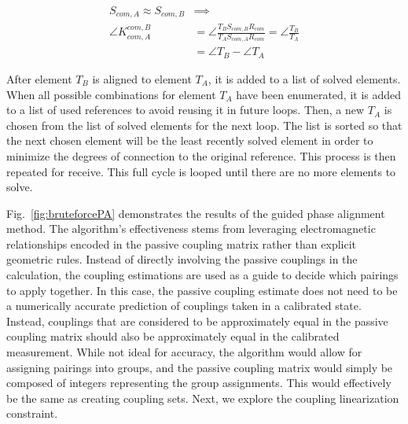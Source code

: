 \documentclass[journal]{IEEEtran}
\begin{document}
\begin{align}
    S_{com,A} \approx S_{com,B} &\implies \nonumber \\
    \angle K^{com,B}_{com,A} &= \angle \frac{T_{B} S_{com,B} R_{com}}{T_{A} S_{com,A} R_{com}} = \angle \frac{T_B}{T_A} \nonumber \\
    &= \angle T_B - \angle T_A
    \label{eq:phaseAlign}
\end{align}


After element $T_B$ is aligned to element $T_A$, it is added to a list of solved elements. When all possible combinations for element $T_A$ have been enumerated, it is added to a list of used references to avoid reusing it in future loops. Then, a new $T_A$ is chosen from the list of solved elements for the next loop. The list is sorted so that the next chosen element will be the least recently solved element in order to minimize the degrees of connection to the original reference. This process is then repeated for receive. This full cycle is looped until there are no more elements to solve.

Fig.~\ref{fig:bruteforcePA} demonstrates the results of the guided phase alignment method. The algorithm's effectiveness stems from leveraging electromagnetic relationships encoded in the passive coupling matrix rather than explicit geometric rules. Instead of directly involving the passive couplings in the calculation, the coupling estimations are used as a guide to decide which pairings to apply together. In this case, the passive coupling estimate does not need to be a numerically accurate prediction of couplings taken in a calibrated state. Instead, couplings that are considered to be approximately equal in the passive coupling matrix should also be approximately equal in the calibrated measurement. While not ideal for accuracy, the algorithm would allow for assigning pairings into groups, and the passive coupling matrix would simply be composed of integers representing the group assignments. This would effectively be the same as creating coupling sets. Next, we explore the coupling linearization constraint.
\end{document}
